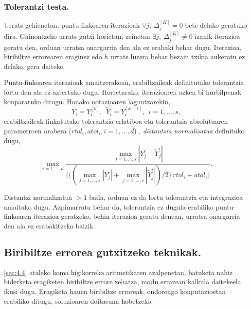 \subsubsection*{Tolerantzi testa.}

Urrats gehienetan, puntu-finkoaren iterazioak $\forall j, \ \Delta_{j}^{[K]}=0$ bete delako geratuko dira. Gainontzeko urrats gutxi horietan, zeinetan  $\exists j,  \ \Delta_{j}^{[K]} \neq 0$ izanik iterazioa geratu den, orduan  urratsa onargarria den ala ez erabaki behar dugu. Iterazioa, biribiltze errorearen eraginez edo $h$ urrats luzera  behar bezain txikia aukeratu ez delako, gera daiteke.

Puntu-finkoaren iterazioak amaitzerakoan, erabiltzaileak definitutako tolerantzia lortu den ala ez aztertuko dugu. Horretarako, iterazioaren azken bi hurbilpenak konparatuko ditugu. Honako notazioaren laguntzarekin,
\begin{equation*}
Y_i=Y_i^{[k]}, \ \ \tilde{Y}_i=Y_i^{[k-1]}, \ \ i=1,\dots,s,
\end{equation*}  
erabiltzaileak finkatutako tolerantzia erlatiboa eta tolerantzia absolutuaren parametroen arabera ($rtol_i,atol_i, i=1,\dots,d$) , \emph{distantzia normalizatua} definituko dugu,
\begin{equation*}
\max_{i=1,\dots,d} \frac{\max_{j=1,\dots,s} |Y_j^i-\tilde{Y}_j^i|}
                        {\bigg(\big((\max_{j=1,\dots,s} |Y_j^i|+\max_{j=1,\dots,s} |\tilde{Y}_j^i|)/2 \big) \ rtol_i+ atol_i \bigg)}.
\end{equation*}

Distantzi normalizatua $>1$ bada, orduan ez da lortu tolerantzia eta integrazioa amaituko dugu.
Azpimarratu behar da, tolerantzia ez dugula erabiliko puntu-finkoaren iterazioa geratzeko, behin iterazioa geratu denean, urratsa onargarria den ala ez erabakitzeko baizik.

\subsection{Biribiltze errorea gutxitzeko teknikak.}

\ref{sec:4.4} ataleko koma higikorreko aritmetikaren azalpenetan, batuketa nahiz biderketa eragiketen biribiltze errore zehatza, modu errazean kalkula daitekeela ikusi dugu. Eragiketa hauen biribiltze erroreak, ondorengo konputazioetan erabiliko ditugu, soluzioaren doitasuna hobetzeko.

